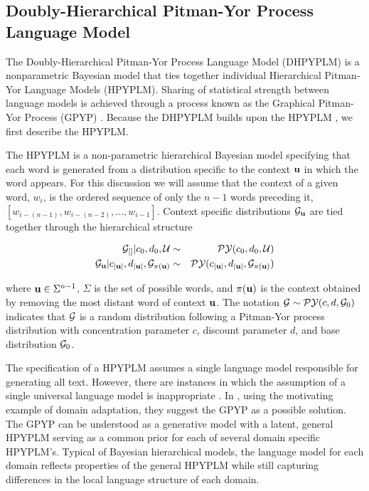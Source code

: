 \subsection{Doubly-Hierarchical Pitman-Yor Process Language Model}

The Doubly-Hierarchical Pitman-Yor Process Language Model (DHPYPLM) \cite{wood and teh} is a nonparametric Bayesian model that ties together individual Hierarchical Pitman-Yor Language Models (HPYPLM). Sharing of statistical strength between language models is achieved through a process known as the Graphical Pitman-Yor Process (GPYP) \cite{wood and teh}.  Because the DHPYPLM builds upon the HPYPLM \cite{teh}, we first describe the HPYPLM.

The HPYPLM is a non-parametric hierarchical Bayesian model specifying that each word is generated from a distribution specific to the context ${\bf u}$ in which the word appears.  For this discussion we will assume that the context of a given word, $w_i$, is the ordered sequence of only the $n-1$ words preceding it, $[w_{i - (n-1)}, w_{i-(n-2)}, \ldots, w_{i-1}]$.  Context specific distributions $\G_{\bu}$ are tied together through the hierarchical structure

\begin{eqnarray}
\G_{[]}| c_0, d_0, \mathcal{U} &\sim& \PY(c_0, d_0, \mathcal{U}) \nonumber \\
\G_\bu | c_{|\bu|}, d_{|\bu|}, \G_{\pi (\bu)} &\sim& \PY( c_{|\bu|}, d_{|\bu|},  \G_{\pi (\bu)}) \label{eqn:hpyplm}
\end{eqnarray}

where $\bu \in \Sigma^{n-1}$, $\Sigma$ is the set of possible words, and $\pi(\bu)$ is the context obtained by removing the most distant word of context $\bu$.  The notation $\G \sim \PY(c,d,\G_0)$ indicates that $\G$ is a random distribution following a Pitman-Yor process \cite{someone} distribution with concentration parameter $c$, discount parameter $d$, and base distribution $\G_0$.

The specification of a HPYPLM assumes a single language model responsible for generating all text.  However, there are instances in which the assumption of a single universal language model is inappropriate \cite{Rosenfeld2000}.  In \cite{wood and teh}, using the motivating example of domain adaptation, they suggest the GPYP as a possible solution. The GPYP can be understood as a generative model with a latent, general HPYPLM serving as a common prior for each of several domain specific HPYPLM's.  Typical of Bayesian hierarchical models, the language model for each domain reflects properties of the general HPYPLM while still capturing differences in the local language structure of each domain.

